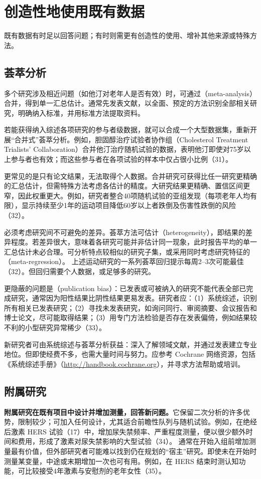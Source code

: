 \section{创造性地使用既有数据}
既有数据有时足以回答问题；有时则需更有创造性的使用、增补其他来源或特殊方法。

\subsection{荟萃分析}
多个研究涉及相近问题（如他汀对老年人是否有效）时，可通过（meta-analysis）合并，得到单一汇总估计。通常先发表文献，以全面、预定的方法识别全部相关研究，明确纳入标准，并用标准方法提取资料。

若能获得纳入综述各项研究的参与者级数据，就可以合成一个大型数据集，重新开展“合并式”荟萃分析。例如，胆固醇治疗试验者协作组（Cholesterol Treatment Trialists’ Collaboration）合并他汀治疗随机试验的数据，表明他汀即使对75岁以上参与者也有效；而这些参与者在各项试验的样本中仅占很小比例（31）。

更常见的是只有论文结果，无法取得个人数据。合并研究可获得比任一研究更精确的汇总估计，但需特殊方法考虑各估计的精度。大研究结果更精确、置信区间更窄，因此权重更大。例如，研究者整合40项随机试验的亚组发现（每项老年人均有限），显示持续至少1年的运动项目降低60岁以上者跌倒及伤害性跌倒的风险（32）。

必须考虑研究间不可避免的差异。荟萃方法可估计（heterogeneity），即结果的差异程度。若差异很大，意味着各研究可能并非估计同一现象，此时报告平均的单一汇总估计未必合理。可分析特点较相似的研究子集，或采用同时考虑研究特征的（meta-regression）。
上述运动研究的一系列荟萃回归提示每周2--3次可能最佳（32）。但回归需要个人数据，或足够多的研究。

更隐蔽的问题是（publication bias）：已发表或可被纳入的研究不能代表全部已完成研究，通常因为阳性结果比阴性结果更易发表。研究者应：（1）系统综述，识别所有相关已发表研究；（2）寻找未发表研究，如询问同行、审阅摘要、会议报告和博士论文，尽可能取得结果；（3）用专门方法检验是否存在发表偏倚，例如结果较不利的小型研究异常稀少（33）。

新研究者可由系统综述与荟萃分析获益：深入了解领域文献，并通过发表建立专业地位。但即使经费不多，也需大量时间与努力。应参考 Cochrane 网络资源，包括《系统综述手册》（\url{http://handbook.cochrane.org}），并寻求方法帮助或培训。

\subsection{附属研究}
\textbf{附属研究在既有项目中设计并增加测量，回答新问题。}它保留二次分析的许多优势，限制较少；可加入任何设计，尤其适合前瞻性队列与随机试验。例如，在绝经后激素 HERS 试验（17）中，增加尿失禁频率、严重程度测量，便以很少额外时间和费用，形成了激素对尿失禁影响的大型试验（34）。
通常在开始入组前增加测量最有价值，但外部研究者可能难以找到仍在规划的“宿主”研究。即使未在开始时测量某变量，中途或末期增加一次也可有用。例如，在 HERS 结束时测认知功能，可比较接受4年激素与安慰剂的老年女性（35）。

